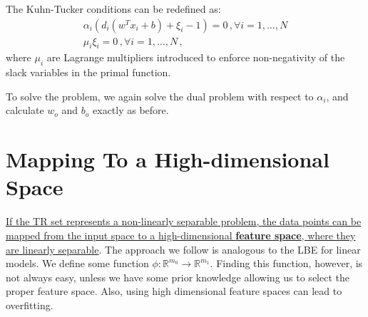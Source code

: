 The Kuhn-Tucker conditions can be redefined as:
\begin{gather*}
    \alpha_i (d_i (w^T x_i + b) + \xi_i - 1) = 0 \, , \forall i = 1, \dots , N \\
    \mu_i \xi_i = 0 \, , \forall i = 1, \dots , N \, ,
\end{gather*}
where $\mu_i$ are Lagrange multipliers introduced to enforce non-negativity of the slack variables in the primal function.

To solve the problem, we again solve the dual problem with respect to $\alpha_i$, and calculate $w_o$ and $b_o$ exactly as before.

\section{Mapping To a High-dimensional Space}

\href{https://en.wikipedia.org/wiki/Cover%27s_theorem#The_Theorem}{If the TR set represents a non-linearly separable problem, the data points can be mapped from the input space to a high-dimensional \textbf{feature space}, where they are linearly separable}. The approach we follow is analogous to the LBE for linear models. We define some function $\phi : \mathbb{R}^{m_0}\xrightarrow{} \mathbb{R}^{m_1}$. Finding this function, however, is not always easy, unless we have some prior knowledge allowing us to select the proper feature space. Also, using high dimensional feature spaces can lead to overfitting.

